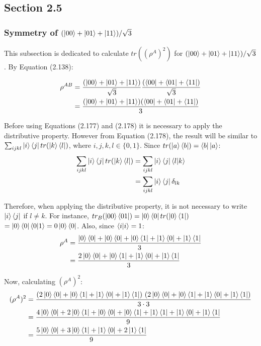 \subsection{Section 2.5}
\subsubsection[Symmetry of Triple State Entanglement]
{Symmetry of $(\ket{00} + \ket{01} + \ket{11})/\sqrt{3}$}

This subsection is dedicated to calculate $tr((\rho^A)^2)$
for $(\ket{00} + \ket{01} + \ket{11})/\sqrt{3}$. By Equation (2.138):

\begin{align}
    \rho^{AB} &= \frac{(\ket{00} + \ket{01} + \ket{11})}{\sqrt{3}}
        \frac{(\bra{00} + \bra{01} + \bra{11})}{\sqrt{3}} \\
        &= \frac{(\ket{00} + \ket{01} + \ket{11})(\bra{00} + \bra{01} + \bra{11})}{3}
\end{align}

Before using Equations (2.177) and (2.178) it is necessary to apply the distributive property.
However from Equation (2.178), the result will be similar to
$\sum_{ijkl} \ket{i}\bra{j} tr(\ket{k}\bra{l})$, where $i, j, k, l \in \{0, 1\}$.
Since $tr(\ket{a}\bra{b}) = \bra{b}\ket{a}$:
\begin{align}
    \sum_{ijkl} \ket{i}\bra{j} tr(\ket{k}\bra{l}) &=
        \sum_{ijkl} \ket{i}\bra{j}\mathop{\mathinner{ \langle{l}|{k}\rangle}} \\
        &= \sum_{ijkl} \ket{i}\bra{j}\delta_{lk}
\end{align}

Therefore, when applying the distributive property,
it is not necessary to write $\ket{i}\bra{j}$ if $l \neq k$.
For instance,
$tr_B(\ket{00}\bra{01}) = \ket{0}\bra{0}tr(\ket{0}\bra{1})$
$= \ket{0}\bra{0}\mathop{\mathinner{ \langle{0}|{1}\rangle}} = 0 \ket{0}\bra{0}$.
Also, since $\mathop{\mathinner{ \langle{i}|{i}\rangle}} = 1$:
\begin{align}
    \rho^A &= \frac{\ket{0}\bra{0} + \ket{0}\bra{0} + \ket{0}\bra{1} +
        \ket{1}\bra{0} + \ket{1}\bra{1}}{3} \\
    &= \frac{2\ket{0}\bra{0} + \ket{0}\bra{1} +
        \ket{1}\bra{0} + \ket{1}\bra{1}}{3}
\end{align}

Now, calculating $(\rho^A)^2$:
\begin{align}
    (\rho^A)^2 &= \frac{(2\ket{0}\bra{0} + \ket{0}\bra{1} +
        \ket{1}\bra{0} + \ket{1}\bra{1})\ (2\ket{0}\bra{0} + \ket{0}\bra{1} +
        \ket{1}\bra{0} + \ket{1}\bra{1})}{3 \cdot 3} \\
    &= \frac{4\ket{0}\bra{0} + 2\ket{0}\bra{1} + \ket{0}\bra{0} + \ket{0}\bra{1} +
        \ket{1}\bra{1} + \ket{1}\bra{0} + \ket{1}\bra{1}}{9} \\
    &= \frac{5\ket{0}\bra{0} + 3\ket{0}\bra{1} + \ket{1}\bra{0} + 2\ket{1}\bra{1}}{9}
\end{align}

